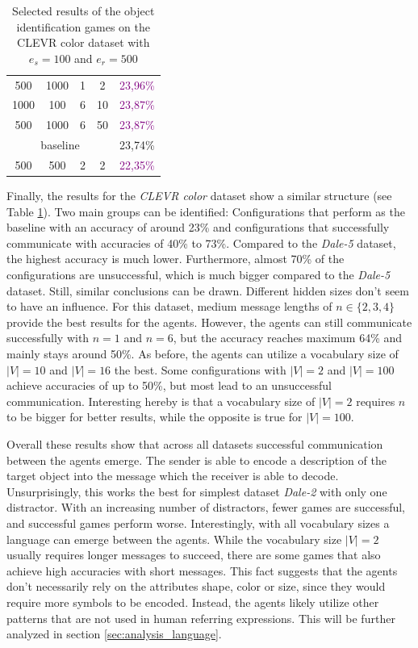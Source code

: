 \begin{table}[ht]
\begin{tabular}{cccc|c}
        {500}                         & {1000}    & {1} & {2}   & \textcolor{purple}{23,96\%}              \\
        {1000}                        & {100}     & {6} & {10}  & \textcolor{purple}{23,87\%}              \\
        {500}                         & {1000}    & {6} & {50}  & \textcolor{purple}{23,87\%}              \\\midrule
        \multicolumn{4}{c|}{baseline} & {23,74\%}                                                          \\\midrule
        {500}                         & {500}     & {2} & {2}   & \textcolor{purple}{22,35\%}              \\
        \bottomrule
    \end{tabular}
    \caption{Selected results of the object identification games on the CLEVR color dataset with $e_s=100$ and $e_r=500$}
    \label{tab:results_discriminator_color}
\end{table}

Finally, the results for the \emph{CLEVR color} dataset show a similar structure (see Table \ref{tab:results_discriminator_color}).
Two main groups can be identified: Configurations that perform as the baseline with an accuracy of around 23\% and configurations that successfully communicate with accuracies of 40\% to 73\%.
Compared to the \emph{Dale-5} dataset, the highest accuracy is much lower.
Furthermore, almost 70\% of the configurations are unsuccessful, which is much bigger compared to the \emph{Dale-5} dataset.
Still, similar conclusions can be drawn.
Different hidden sizes don't seem to have an influence.
For this dataset, medium message lengths of $n \in \{2,3,4\}$ provide the best results for the agents.
However, the agents can still communicate successfully with $n=1$ and $n=6$, but the accuracy reaches maximum 64\% and mainly stays around 50\%.
As before, the agents can utilize a vocabulary size of $|V|=10$ and $|V|=16$ the best.
Some configurations with $|V|=2$ and $|V|=100$ achieve accuracies of up to 50\%, but most lead to an unsuccessful communication.
Interesting hereby is that a vocabulary size of $|V|=2$ requires $n$ to be bigger for better results, while the opposite is true for $|V|=100$.

Overall these results show that across all datasets successful communication between the agents emerge.
The sender is able to encode a description of the target object into the message which the receiver is able to decode.
Unsurprisingly, this works the best for simplest dataset \emph{Dale-2} with only one distractor.
With an increasing number of distractors, fewer games are successful, and successful games perform worse.
Interestingly, with all vocabulary sizes a language can emerge between the agents.
While the vocabulary size $|V|=2$ usually requires longer messages to succeed, there are some games that also achieve high accuracies with short messages.
This fact suggests that the agents don't necessarily rely on the attributes shape, color or size, since they would require more symbols to be encoded.
Instead, the agents likely utilize other patterns that are not used in human referring expressions.
This will be further analyzed in section \ref{sec:analysis_language}.